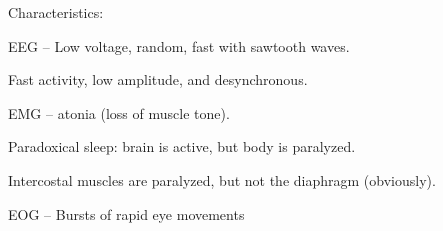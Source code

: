 \begin{coloredlist}
\begin{coloredlist}
        \item Characteristics:
        \begin{coloredlist}
            \item EEG -- Low voltage, random, fast with sawtooth waves.
            \item Fast activity, low amplitude, and desynchronous.
            \item EMG -- atonia (loss of muscle tone).
            \item Paradoxical sleep: brain is active, but body is paralyzed.
            \item Intercostal muscles are paralyzed, but not the diaphragm (obviously).
            \item EOG -- Bursts of rapid eye movements
        \end{coloredlist}
    \end{coloredlist}
\end{coloredlist}
